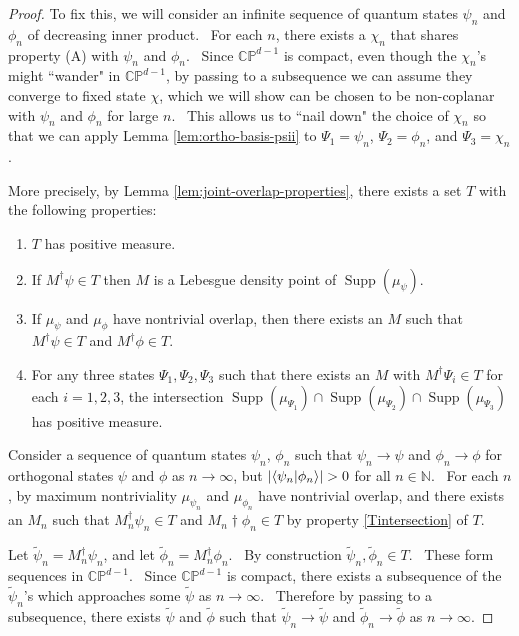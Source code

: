 \documentclass[letterpaper,11pt]{article}
\newcommand{\braket}[2]{\mbox{$ \langle #1 | #2 \rangle $}}
\DeclareMathOperator{\supp}{Supp}
\begin{document}
\begin{proof}
To fix this, we will consider an infinite sequence of quantum states $\psi_n$ and $\phi_n$ of decreasing inner product. \ For each $n$, there exists a $\chi_n$ that shares property (A) with $\psi_n$ and $\phi_n$. \ Since $\mathbb{CP}^{d-1}$ is compact, even though the $\chi_n$'s might ``wander" in $\mathbb{CP}^{d-1}$, by passing to a subsequence we can assume they converge to fixed state $\chi$, which we will show can be chosen to be non-coplanar with $\psi_n$ and $\phi_n$ for large $n$. \ This allows us to ``nail down" the choice of $\chi_n$ so that we can apply Lemma \ref{lem:ortho-basis-psii} to $\Psi_1=\psi_n$, $\Psi_2=\phi_n$, and $\Psi_3=\chi_n$.

More precisely, by Lemma \ref{lem:joint-overlap-properties}, there exists a set $T$ with the following properties:
\begin{enumerate}
\item $T$ has positive measure.
\item If $M^\dagger \psi \in T$ then $M$ is a Lebesgue density point of $\supp(\mu_\psi)$.
\item If $\mu_\psi$ and $\mu_\phi$ have nontrivial overlap, then there exists an $M$ such that $M^\dagger \psi \in T$ and $M^\dagger \phi \in T$.
\item For any three states $\Psi_1,\Psi_2,\Psi_3$ such that there exists an $M$ with $M^\dagger \Psi_i \in T$ for each $i=1,2,3$, the intersection $\supp(\mu_{\Psi_1}) \cap \supp(\mu_{\Psi_2}) \cap \supp(\mu_{\Psi_3})$ has positive measure.
\end{enumerate}
Consider a sequence of quantum states $\psi_n$, $\phi_n$ such that $\psi_n \rightarrow \psi$ and $\phi_n \rightarrow \phi$ for orthogonal states $\psi$ and $\phi$ as $n\rightarrow \infty$, but $|\braket{\psi_n}{\phi_n}|>0$ for all $n\in\mathbb{N}$. \ For each $n$, by maximum nontriviality $\mu_{\psi_n}$ and $\mu_{\phi_n}$ have nontrivial overlap, and there exists an $M_n$ such that $M_n^\dagger \psi_n \in T$ and $M_n\dagger \phi_n \in T$ by property \ref{Tintersection} of $T$.

Let $\tilde{\psi}_n = M_n^\dagger \psi_n$, and let $\tilde{\phi}_n =M_n^\dagger \phi_n$. \ By construction $\tilde{\psi}_n, \tilde{\phi}_n \in T$. \ These form sequences in $\mathbb{CP}^{d-1}$. \ Since $\mathbb{CP}^{d-1}$ is compact, there exists a subsequence of the $\tilde{\psi}_n$'s which approaches some $\tilde{\psi}$ as $n\rightarrow \infty$. \ Therefore by passing to a subsequence, there exists $\tilde{\psi}$ and $\tilde{\phi}$ such that $\tilde{\psi}_n \rightarrow \tilde{\psi}$ and $\tilde{\phi}_n \rightarrow \tilde{\phi}$ as $n\rightarrow \infty$.


\end{proof}
\end{document}
